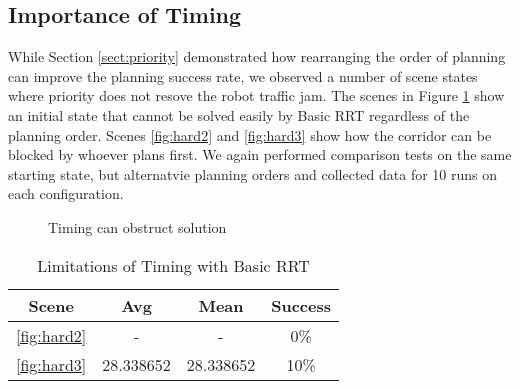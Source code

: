 \documentclass[12pt,journal,compsoc]{IEEEtran}
\begin{document}

\subsection{Importance of Timing}
While Section \ref{sect:priority} demonstrated how rearranging the order of planning can improve the planning success rate, we observed a number of scene states where priority does not resove the robot traffic jam. The scenes in Figure \ref{fig:hardscenes} show an initial state that cannot be solved easily by Basic RRT regardless of the planning order. Scenes \ref{fig:hard2} and \ref{fig:hard3} show how the corridor can be blocked by whoever plans first. We again performed comparison tests on the same starting state, but alternatvie planning orders and collected data for 10 runs on each configuration.

\begin{figure}[ht]
\centering
{}
\caption{Timing can obstruct solution}\label{fig:hardscenes}
\end{figure}

\begin{table}[ht]
\renewcommand{\arraystretch}{1.3}
\caption{Limitations of Timing with Basic RRT}
\label{hardresults}
\centering 
\begin{tabular}{||c||c||c||c||}
\hline
\bfseries Scene & \bfseries Avg & \bfseries Mean & \bfseries Success\\
\hline\hline
\ref{fig:hard2} & - & - & 0\%\\
\hline
\ref{fig:hard3} & 28.338652 & 28.338652 & 10\%\\
\hline
\hline
\end{tabular}
\end{table}
\end{document}
